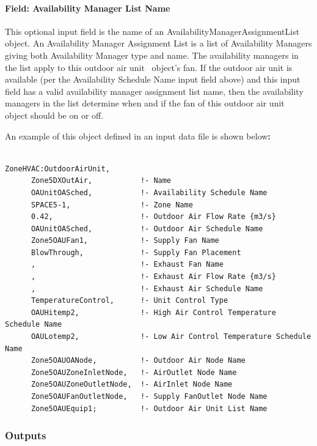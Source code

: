 \paragraph{Field: Availability Manager List Name}\label{field-availability-manager-list-name-4}

This optional input field is the name of an AvailabilityManagerAssignmentList object. An Availability Manager Assignment List is a list of Availability Managers giving both Availability Manager type and name. The availability managers in the list apply to this outdoor air unit~ object's fan. If the outdoor air unit is available (per the Availability Schedule Name input field above) and this input field has a valid availability manager assignment list name, then the availability managers in the list determine when and if the fan of this outdoor air unit~ object should be on or off.

An example of this object defined in an input data file is shown below\textbf{:}

\begin{lstlisting}

ZoneHVAC:OutdoorAirUnit,
      Zone5DXOutAir,           !- Name
      OAUnitOASched,           !- Availability Schedule Name
      SPACE5-1,                !- Zone Name
      0.42,                    !- Outdoor Air Flow Rate {m3/s}
      OAUnitOASched,           !- Outdoor Air Schedule Name
      Zone5OAUFan1,            !- Supply Fan Name
      BlowThrough,             !- Supply Fan Placement
      ,                        !- Exhaust Fan Name
      ,                        !- Exhaust Air Flow Rate {m3/s}
      ,                        !- Exhaust Air Schedule Name
      TemperatureControl,      !- Unit Control Type
      OAUHitemp2,              !- High Air Control Temperature Schedule Name
      OAULotemp2,              !- Low Air Control Temperature Schedule Name
      Zone5OAUOANode,          !- Outdoor Air Node Name
      Zone5OAUZoneInletNode,   !- AirOutlet Node Name
      Zone5OAUZoneOutletNode,  !- AirInlet Node Name
      Zone5OAUFanOutletNode,   !- Supply FanOutlet Node Name
      Zone5OAUEquip1;          !- Outdoor Air Unit List Name
\end{lstlisting}

\subsubsection{Outputs}\label{outputs-5-012}

